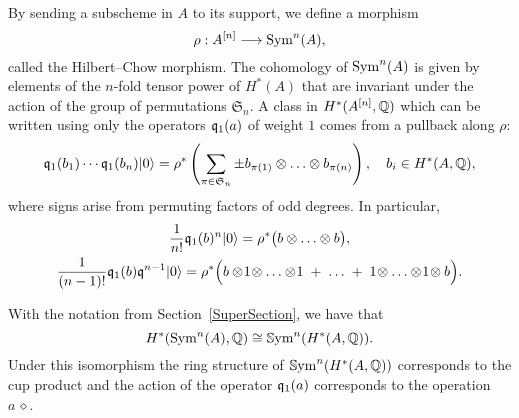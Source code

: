 By sending a subscheme in $A$ to its support, we define a morphism
\begin{equation}\label{HilbertChow}
\rho : A^{[n]} \longrightarrow \operatorname{Sym}^n(A),
\end{equation}
called the Hilbert--Chow morphism. The cohomology of $\operatorname{Sym}^n(A)$ is given by elements of the $n$-fold tensor power of $H^*(A)$ that are invariant under the action of the group of permutations $\mathfrak{S}_n$. A class in $H^*(A^{[n]},\mathbb{Q})$ which can be written using only the operators $\mathfrak{q}_1(a)$ of weight $1$ comes from a pullback along $\rho$:
\begin{equation}
\label{qSym}
\mathfrak{q}_1(b_1)\cdots \mathfrak{q}_1(b_n)|0\rangle = \rho^*\left( \sum_{\pi\in\mathfrak{S}_n } \pm b_{\pi(1)}\otimes\ldots\otimes b_{\pi(n)} \right), \quad b_i\in H^*(A,\mathbb{Q}),
\end{equation}
where signs arise from permuting factors of odd degrees. In particular,
\begin{gather} \label{q0primitive}
\frac{1}{n!}\mathfrak{q}_1(b)^n |0\rangle = \rho^*\big( b\otimes \ldots \otimes b\big),
\\ \label{q1primitive}
\frac{1}{(n-1)!}\mathfrak{q}_1(b)\mathfrak{q}^{n-1}|0\rangle =\rho^*\Big( b\otimes\! 1\!\otimes\ldots\otimes\! 1\; + \;\ldots\; +\; 1\!\otimes\ldots\otimes\! 1\! \otimes b\Big) .
\end{gather}
\begin{remark}
With the notation from Section~\ref{SuperSection}, we have that
$$
H^*(\operatorname{Sym}^n(A),\mathbb{Q}) \cong \operatorname{\mathbb{S}ym}^n(H^*(A,\mathbb{Q})).
$$
Under this isomorphism the ring structure of $\operatorname{\mathbb{S}ym}^n(H^*(A,\mathbb{Q}))$ corresponds to the cup product and the action of the operator $\mathfrak{q}_1(a)$ corresponds to the operation $a\,\diamond$.
\end{remark}

